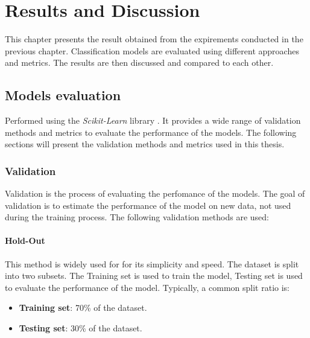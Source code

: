 %
%
\hypersetup{colorlinks=true, linkcolor=red}
\hypersetup{citecolor=blue}

\chapter{Results and Discussion} \label{chap:results_and_discussion}

    This chapter presents the result obtained from the expirements conducted in the previous chapter. Classification models are evaluated using different approaches and metrics. The results are then discussed and compared to each other.

    \section{Models evaluation}

        Performed using the \textit{Scikit-Learn} library \cite{sklearn_api}. It provides a wide range of validation methods and metrics to evaluate the performance of the models. The following sections will present the validation methods and metrics used in this thesis.

        \subsection{Validation}

            Validation is the process of evaluating the perfomance of the models. The goal of validation is to estimate the performance of the model on new data, not used during the training process. The following validation methods are used:

            \subsubsection{Hold-Out}

                This method is widely used for for its simplicity and speed. The dataset is split into two subsets. The Training set is used to train the model, Testing set is used to evaluate the performance of the model. Typically, a common split ratio is:
                \begin{itemize}
                    \item \textbf{Training set}: 70\% of the dataset.
                    \item \textbf{Testing set}: 30\% of the dataset.
                \end{itemize}
            

